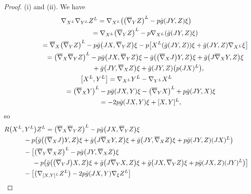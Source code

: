 \documentclass[pdftex]{sigma}
\numberwithin{equation}{section}
\theoremstyle{definition}
\newcommand{\bbn}{\overline{\nabla}}
\newcommand{\bgg}{\bar g}
\begin{document}
\begin{proof} (i) and (ii).
We have
\begin{gather*}\nabla_{X^{L}} \nabla_{Y^{L}} Z^{L}
 = \nabla_{X^{L}} \bigl( \bigl(\bbn_{Y} Z\bigr)^{L} - p \bgg (J Y, Z) \xi\bigr)\nonumber\\
 \hphantom{\nabla_{X^{L}} \nabla_{Y^{L}} Z^{L}}{}
 = \nabla_{X^{L}} \bigl(\bbn_{Y} Z\bigr)^{L} - p \nabla_{X^{L}} (\bgg (J Y, Z) \xi)\nonumber\\
 \hphantom{\nabla_{X^{L}} \nabla_{Y^{L}} Z^{L}}{}
 = \bbn_{X}\bigl(\bbn_{Y} Z\bigr)^{L} - p \bgg \bigl(J X, \bbn_{Y} Z \bigr) \xi - p \bigl[ X^{L} (\bgg(J Y, Z)) \xi + \bgg(J Y, Z) \nabla_{X^ L} \xi \bigr]\nonumber\\
 \hphantom{\nabla_{X^{L}} \nabla_{Y^{L}} Z^{L}}{}
 =\bigl(\bbn_{X} \bbn_{Y} Z\bigr)^{L} - p \bgg\bigl(J X, \bbn_{Y} Z\bigr) \xi
 - \bgg\bigl(\bigl(\bbn_{X} J\bigr) Y, Z\bigr) \xi + \bgg\bigl(J \bbn_{X} Y, Z\bigr) \xi \nonumber\\
 \hphantom{\nabla_{X^{L}} \nabla_{Y^{L}} Z^{L}=}{}
 + \bgg \bigl(J Y, \bbn_{X} Z\bigr) \xi + \bgg (JY, Z) \bigl(p (J X)^{L}\bigr),\nonumber\\
\bigl[X^{L}, Y^{L}\bigr]
 = \nabla_{X^ L} Y^{L} - \nabla_{Y^ L} X^{L} \nonumber\\
 \hphantom{\bigl[X^{L}, Y^{L}\bigr]}{}
 = \bigl(\bbn_{X} Y\bigr)^{L} - p \bgg(J X, Y) \xi - \bigl(\bbn_{Y} X\bigr)^{L} + p \bgg(J Y, X) \xi \nonumber\\
 \hphantom{\bigl[X^{L}, Y^{L}\bigr]}{}
 = -2 p \bgg(J X, Y) \xi + [X, Y]^{L}, \nonumber
\end{gather*}
so
\begin{align*}&R\bigl(X^{L}, Y^{L}\bigr) Z^{L}
 = \bigl(\bbn_{X} \bbn_{Y} Z\bigr)^{L} - p \bgg\bigl(J X, \bbn_{Y} Z\bigr) \xi \nonumber\\
 &\qquad\quad{} - p \bigl(\bgg\bigl(\bigl(\bbn_{X} J\bigr) Y, Z\bigr) \xi + \bgg\bigl(J \bbn_{X} Y, Z\bigr) \xi + \bgg\bigl(J Y, \bbn_{X} Z\bigr) \xi + p \bgg(J Y, Z) (J X)^{L}\bigr) \nonumber\\
 &\qquad\quad{} - \bigl[\bigl(\bbn_{Y} \bbn_{X} Z\bigr)^{L} - p \bgg\bigl(JY, \bbn_{X} Z\bigr) \xi \nonumber\\
 &\qquad\quad\hphantom{- \bigl[\, }{} - p \bigl(\bgg\bigl(\bigl(\bbn_{Y} J\bigr) X, Z\bigr) \xi + \bgg\bigl(J \bbn_{Y} X, Z\bigr) \xi + \bgg\bigl(J X, \bbn_{Y} Z\bigr) \xi + p \bgg(J X, Z) (J Y)^{L}\bigr)\bigr] \nonumber\\
 &\qquad\quad{} - \bigl[\bigl(\nabla_{[X,Y]^{L}} Z^{L}\bigr) - 2 p \bgg (J X, Y) \nabla_{\xi} Z^{L}\bigr] \nonumber\\

\end{align*}
\end{proof}
\end{document}
